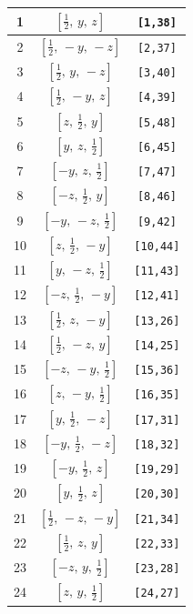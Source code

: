 \documentclass[fleqn,8pt]{jsarticle}
\begin{document}
\begin{longtable}{ccc}
1 & $\left[ \frac{1}{2},\, y,\, z \right]$ & {\tt [1,38]} \\ \hline
2 & $\left[ \frac{1}{2},\, - y,\, - z \right]$ & {\tt [2,37]} \\ \hline
3 & $\left[ \frac{1}{2},\, y,\, - z \right]$ & {\tt [3,40]} \\ \hline
4 & $\left[ \frac{1}{2},\, - y,\, z \right]$ & {\tt [4,39]} \\ \hline
5 & $\left[ z,\, \frac{1}{2},\, y \right]$ & {\tt [5,48]} \\ \hline
6 & $\left[ y,\, z,\, \frac{1}{2} \right]$ & {\tt [6,45]} \\ \hline
7 & $\left[ - y,\, z,\, \frac{1}{2} \right]$ & {\tt [7,47]} \\ \hline
8 & $\left[ - z,\, \frac{1}{2},\, y \right]$ & {\tt [8,46]} \\ \hline
9 & $\left[ - y,\, - z,\, \frac{1}{2} \right]$ & {\tt [9,42]} \\ \hline
10 & $\left[ z,\, \frac{1}{2},\, - y \right]$ & {\tt [10,44]} \\ \hline
11 & $\left[ y,\, - z,\, \frac{1}{2} \right]$ & {\tt [11,43]} \\ \hline
12 & $\left[ - z,\, \frac{1}{2},\, - y \right]$ & {\tt [12,41]} \\ \hline
13 & $\left[ \frac{1}{2},\, z,\, - y \right]$ & {\tt [13,26]} \\ \hline
14 & $\left[ \frac{1}{2},\, - z,\, y \right]$ & {\tt [14,25]} \\ \hline
15 & $\left[ - z,\, - y,\, \frac{1}{2} \right]$ & {\tt [15,36]} \\ \hline
16 & $\left[ z,\, - y,\, \frac{1}{2} \right]$ & {\tt [16,35]} \\ \hline
17 & $\left[ y,\, \frac{1}{2},\, - z \right]$ & {\tt [17,31]} \\ \hline
18 & $\left[ - y,\, \frac{1}{2},\, - z \right]$ & {\tt [18,32]} \\ \hline
19 & $\left[ - y,\, \frac{1}{2},\, z \right]$ & {\tt [19,29]} \\ \hline
20 & $\left[ y,\, \frac{1}{2},\, z \right]$ & {\tt [20,30]} \\ \hline
21 & $\left[ \frac{1}{2},\, - z,\, - y \right]$ & {\tt [21,34]} \\ \hline
22 & $\left[ \frac{1}{2},\, z,\, y \right]$ & {\tt [22,33]} \\ \hline
23 & $\left[ - z,\, y,\, \frac{1}{2} \right]$ & {\tt [23,28]} \\ \hline
24 & $\left[ z,\, y,\, \frac{1}{2} \right]$ & {\tt [24,27]} \\
\end{longtable}
\end{document}

